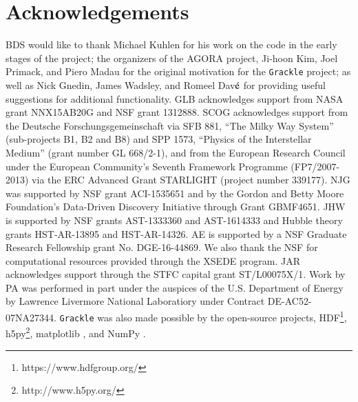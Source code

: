 \section*{Acknowledgements}

BDS would like to thank Michael Kuhlen for his work on the code in the
early stages of the project; the organizers of the AGORA project,
Ji-hoon Kim, Joel Primack, and Piero Madau for the original motivation
for the \texttt{Grackle} project; as well as Nick Gnedin, James
Wadsley, and Romeel Dav$\acute{\rm e}$ for providing useful
suggestions for additional functionality.  GLB acknowledges support
from NASA grant NNX15AB20G and NSF grant 1312888. SCOG acknowledges
support from the Deutsche Forschungsgemeinschaft via SFB 881, ``The
Milky Way System'' (sub-projects B1, B2 and B8) and SPP 1573,
``Physics of the Interstellar Medium'' (grant number GL 668/2-1), and
from the European Research Council under the European Community's
Seventh Framework Programme (FP7/2007-2013) via the ERC Advanced Grant
STARLIGHT (project number 339177).  NJG was supported by NSF grant
ACI-1535651 and by the Gordon and Betty Moore Foundation’s Data-Driven
Discovery Initiative through Grant GBMF4651.  JHW is supported by NSF
grants AST-1333360 and AST-1614333 and Hubble theory grants
HST-AR-13895 and HST-AR-14326.  AE is supported by a NSF Graduate
Research Fellowship grant No. DGE-16-44869. We also thank the NSF for
computational resources provided through the XSEDE program. JAR
acknowledges support through the STFC capital grant ST/L00075X/1.
Work by PA was performed in part under the auspices of the
U.S. Department of Energy by Lawrence Livermore National Laboratiory
under Contract DE-AC52-07NA27344.  \texttt{Grackle} was also made
possible by the open-source projects,
HDF\footnote{https://www.hdfgroup.org/},
h5py\footnote{http://www.h5py.org/}, matplotlib
\citep{2005ASPC..347...91B}, and NumPy \citep{numpy}.

